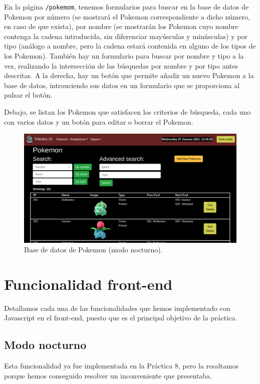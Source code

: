 \documentclass{article}
\begin{document}
En la página \texttt{/pokemom}, tenemos formularios para buscar en la
base de datos de Pokemon por número (se mostrará el Pokemon
correspondiente a dicho número, en caso de que exista), por nombre (se
mostrarán los Pokemon cuyo nombre contenga la cadena introducida, sin
diferenciar mayúsculas y minúsculas) y por tipo (análogo a nombre,
pero la cadena estará contenida en alguno de los tipos de los
Pokemon). También hay un formulario para buscar por nombre y tipo a la
vez, realizando la intersección de las búsquedas por nombre y por tipo
antes descritas. A la derecha, hay un botón que permite añadir un
nuevo Pokemon a la base de datos, introuciendo sus datos en un
formulario que se proporciona al pulsar el botón.

Debajo, se listan los Pokemon que satisfacen los criterios de
búsqueda, cada uno con varios datos y un botón para editar o borrar el
Pokemon.

\begin{figure}[H]
  \centering
  \includegraphics[width=180mm]{imgs/pokemon}
  \caption{Base de datos de Pokemon (modo nocturno).}
  \label{fig:pokemon}
\end{figure}

\section{Funcionalidad front-end}
Detallamos cada una de las funcionalidades que hemos implementado con
Javascript en el front-end, puesto que es el principal objetivo de la
práctica.

\subsection{Modo nocturno}

Esta funcionalidad ya fue implementada en la Práctica 8, pero la
resaltamos porque hemos conseguido resolver un inconveniente que
presentaba.
\end{document}
